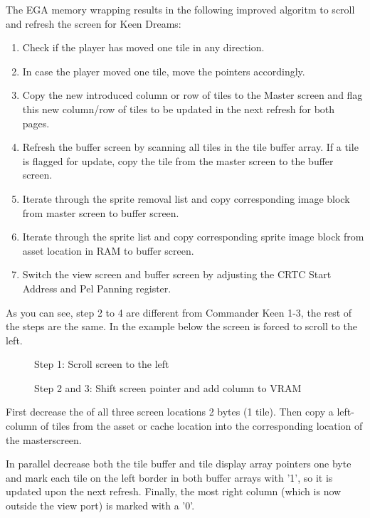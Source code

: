 \documentclass[book.tex]{subfiles}
\begin{document}
The EGA memory wrapping results in the following improved algoritm to scroll and refresh the screen for Keen Dreams:
\begin{enumerate}
\item Check if the player has moved one tile in any direction.
\item In case the player moved one tile, move the  pointers accordingly. 
\item Copy the new introduced column or row of tiles to the Master screen and flag this new column/row of tiles to be updated in the next refresh for both pages. 
\item Refresh the buffer screen by scanning all tiles in the tile buffer array. If a tile is flagged for update, copy the tile from the master screen to the buffer screen.
\item Iterate through the sprite removal list and copy corresponding image block from master screen to buffer screen. 
\item Iterate through the sprite list and copy corresponding sprite image block from asset location in RAM to buffer screen.
\item Switch the view screen and buffer screen by adjusting the CRTC Start Address and Pel Panning register.
\end{enumerate}

As you can see, step 2 to 4 are different from Commander Keen 1-3, the rest of the steps are the same. In the example below the screen is forced to scroll to the left.
\\

\begin{figure}[H]
\centering
 \caption{Step 1: Scroll screen to the left}
 \label{fig:kc4_6_start}
\end{figure}

\begin{figure}[H]
\centering
 \caption{Step 2 and 3: Shift screen pointer and add column to VRAM}
 \label{fig:kc4_6_add_column}
\end{figure}


First decrease the  of all three screen locations 2 bytes (1 tile). Then copy a left-column of tiles from the asset or cache location into the corresponding location of the masterscreen.\\
\par
In parallel decrease both the tile buffer and tile display array pointers one byte and mark each tile on the left border in both buffer arrays with '1', so it is updated upon the next refresh.
Finally, the most right column (which is now outside the view port) is marked with a '0'.
\end{document}
